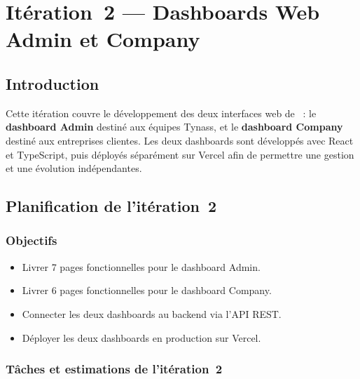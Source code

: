 
\chapter{Itération~2 --- Dashboards Web Admin et Company}

\section{Introduction}

Cette itération couvre le développement des deux interfaces web de \tynassit{}~:
le \textbf{dashboard Admin} destiné aux équipes Tynass, et le \textbf{dashboard Company}
destiné aux entreprises clientes. Les deux dashboards sont développés avec React et TypeScript, puis déployés
séparément sur Vercel afin de permettre une gestion et une évolution indépendantes.

\section{Planification de l'itération~2}

\subsection{Objectifs}

\begin{itemize}
  \item Livrer 7 pages fonctionnelles pour le dashboard Admin.
  \item Livrer 6 pages fonctionnelles pour le dashboard Company.
  \item Connecter les deux dashboards au backend via l'API REST.
  \item Déployer les deux dashboards en production sur Vercel.
\end{itemize}

\subsection{Tâches et estimations de l'itération~2}

